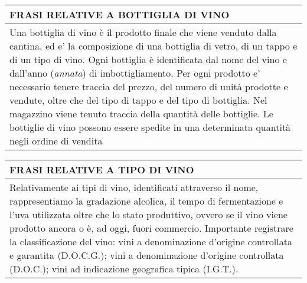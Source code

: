 \begin{center}
	\begin{tabular}{P{16cm}}
		\toprule
		 \textbf {\large {FRASI RELATIVE A BOTTIGLIA DI VINO}}                                                                                                                                                                                                                                                                                                                                                                                                                                                                                                     \\
		\midrule
		Una bottiglia di vino è il prodotto finale che viene venduto dalla cantina, ed e' la composizione di una bottiglia di vetro, di un tappo e di un tipo di vino. Ogni bottiglia è identificata dal nome del vino e dall'anno (\emph{annata}) di imbottigliamento. Per ogni prodotto e' necessario tenere traccia del prezzo, del numero di unità prodotte e vendute, oltre che del tipo di tappo e del tipo di bottiglia. Nel magazzino viene tenuto traccia della quantità delle bottiglie. Le bottiglie di vino possono essere spedite in una determinata quantità negli ordine di vendita \\
		\bottomrule
	\end{tabular}

	\vspace{0.5cm}

	\begin{tabular}{P{16cm}}
		\toprule
		 \textbf {\large {FRASI RELATIVE A TIPO DI VINO}}                                                                                                                                                                                                                                                                                                                                                                                          \\
		\midrule
		Relativamente ai tipi di vino, identificati attraverso il nome, rappresentiamo la gradazione alcolica, il tempo di fermentazione e l'uva utilizzata oltre che lo stato produttivo, ovvero se il vino viene prodotto ancora o è, ad oggi, fuori commercio. Importante registrare la classificazione del vino: vini a denominazione d'origine controllata e garantita (D.O.C.G.); vini a denominazione d'origine controllata (D.O.C.); vini ad indicazione geografica tipica (I.G.T.). \\
		\bottomrule
	\end{tabular}


\end{center}
